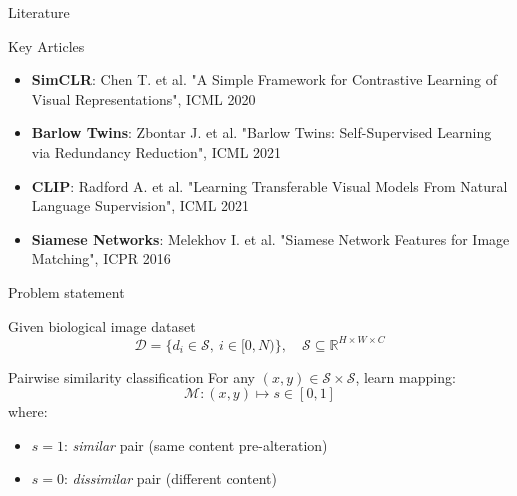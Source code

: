 \documentclass{beamer}
\begin{document}
\begin{frame}{Literature}
\begin{block}{Key Articles}
    \begin{itemize}
        \item \textbf{SimCLR}: Chen T. et al. "A Simple Framework for Contrastive Learning of Visual Representations", ICML 2020
        \item \textbf{Barlow Twins}: Zbontar J. et al. "Barlow Twins: Self-Supervised Learning via Redundancy Reduction", ICML 2021  
        \item \textbf{CLIP}: Radford A. et al. "Learning Transferable Visual Models From Natural Language Supervision", ICML 2021
        \item \textbf{Siamese Networks}: Melekhov I. et al. "Siamese Network Features for Image Matching", ICPR 2016
    \end{itemize}
\end{block}
\end{frame}


\begin{frame}{Problem statement}
\begin{block}{Given biological image dataset}
    \begin{equation*}
        \mathcal{D} = \{d_i \in \mathcal{S},\ i \in [0, N)\},\quad 
        \mathcal{S} \subseteq \mathbb{R}^{H \times W \times C}
    \end{equation*}
\end{block}

\begin{block}{Pairwise similarity classification}
    For any $(x, y) \in \mathcal{S} \times \mathcal{S}$, learn mapping:
    \begin{equation*}
        \mathcal{M}: (x, y) \mapsto s \in [0, 1]
    \end{equation*}
    where:
    \begin{itemize}
        \item $s=1$: \textit{similar} pair (same content pre-alteration)
        \item $s=0$: \textit{dissimilar} pair (different content)
    \end{itemize}
\end{block}
\end{frame}

\end{document}
